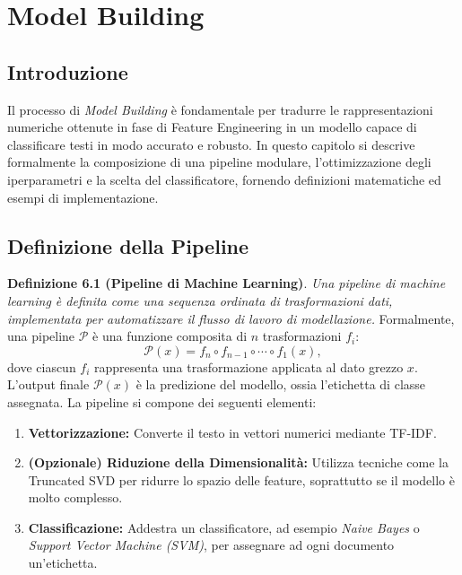  \chapter{Model Building}

 \section{Introduzione}
 Il processo di \emph{Model Building} è fondamentale per tradurre le rappresentazioni numeriche ottenute in fase di Feature Engineering in un modello capace di classificare testi in modo accurato e robusto. In questo capitolo si descrive formalmente la composizione di una pipeline modulare, l'ottimizzazione degli iperparametri e la scelta del classificatore, fornendo definizioni matematiche ed esempi di implementazione.

 \section{Definizione della Pipeline}
 \textbf{Definizione 6.1 (Pipeline di Machine Learning)}. \textit{Una pipeline di machine learning è definita come una sequenza ordinata di trasformazioni dati, implementata per automatizzare il flusso di lavoro di modellazione.} Formalmente, una pipeline \( \mathcal{P} \) è una funzione composita di \( n \) trasformazioni \( f_i \):
 \[
 \mathcal{P}(x) = f_n \circ f_{n-1} \circ \cdots \circ f_1(x),
 \]
 dove ciascun \( f_i \) rappresenta una trasformazione applicata al dato grezzo \( x \). L'output finale \( \mathcal{P}(x) \) è la predizione del modello, ossia l'etichetta di classe assegnata.
 La pipeline si compone dei seguenti elementi:
 \begin{enumerate}
   \item \textbf{Vettorizzazione:} Converte il testo in vettori numerici mediante TF-IDF.
   \item \textbf{(Opzionale) Riduzione della Dimensionalità:} Utilizza tecniche come la Truncated SVD per ridurre lo spazio delle feature, soprattutto se il modello è molto complesso.
   \item \textbf{Classificazione:} Addestra un classificatore, ad esempio \emph{Naive Bayes} o \emph{Support Vector Machine (SVM)}, per assegnare ad ogni documento un'etichetta.
 \end{enumerate}
 \newpage

